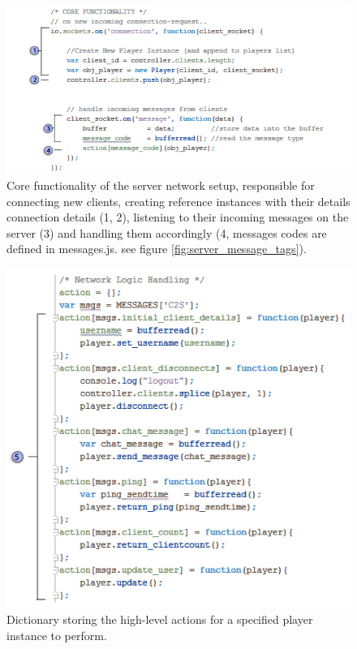\documentclass[bsc,frontabs,twoside,singlespacing,parskip,deptreport]{infthesis}     %
\begin{document}
\begin{figure}[H]
\includegraphics[scale=0.72]{images/server_code.jpg}
\caption{Core functionality of the server network setup, responsible for connecting new clients, creating reference instances with their details connection details (1, 2), listening to their incoming messages on the server (3) and handling them accordingly (4, messages codes are defined in messages.js. see figure \ref{fig:server_message_tags}). }
\label{fig:server_core}
\end{figure}

\begin{figure}[H]
\includegraphics[scale=0.72]{images/server_actions.jpg}
\caption{Dictionary storing the high-level actions for a specified player instance to perform.}
\label{fig:server_actions}
\end{figure}
\end{document}
